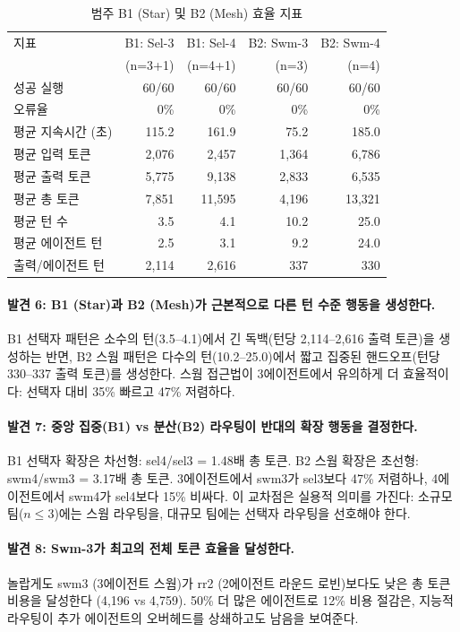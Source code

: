 \begin{table}[H]
\centering
\caption{범주 B1 (Star) 및 B2 (Mesh) 효율 지표}
\label{tab:cat-b}
{\small
\begin{tabular}{lrrrr}
\toprule
지표 & B1: Sel-3 & B1: Sel-4 & B2: Swm-3 & B2: Swm-4 \\
    & (n=3+1)   & (n=4+1)   & (n=3)     & (n=4)     \\
\midrule
성공 실행       & 60/60 & 60/60 & 60/60 & 60/60 \\
오류율           & 0\% & 0\% & 0\% & 0\% \\
평균 지속시간 (초) & 115.2 & 161.9 & 75.2 & 185.0 \\
평균 입력 토큰   & 2,076 & 2,457 & 1,364 & 6,786 \\
평균 출력 토큰   & 5,775 & 9,138 & 2,833 & 6,535 \\
평균 총 토큰     & 7,851 & 11,595 & 4,196 & 13,321 \\
평균 턴 수       & 3.5 & 4.1 & 10.2 & 25.0 \\
평균 에이전트 턴 & 2.5 & 3.1 & 9.2 & 24.0 \\
출력/에이전트 턴 & 2,114 & 2,616 & 337 & 330 \\
\bottomrule
\end{tabular}
}
\end{table}

\paragraph{발견 6: B1 (Star)과 B2 (Mesh)가 근본적으로 다른 턴 수준 행동을 생성한다.}
B1 선택자 패턴은 소수의 턴(3.5--4.1)에서 긴 독백(턴당 2,114--2,616 출력 토큰)을 생성하는 반면, B2 스웜 패턴은 다수의 턴(10.2--25.0)에서 짧고 집중된 핸드오프(턴당 330--337 출력 토큰)를 생성한다. 스웜 접근법이 3에이전트에서 유의하게 더 효율적이다: 선택자 대비 35\% 빠르고 47\% 저렴하다.

\paragraph{발견 7: 중앙 집중(B1) vs 분산(B2) 라우팅이 반대의 확장 행동을 결정한다.}
B1 선택자 확장은 차선형: sel4/sel3 = 1.48배 총 토큰. B2 스웜 확장은 초선형: swm4/swm3 = 3.17배 총 토큰. 3에이전트에서 swm3가 sel3보다 47\% 저렴하나, 4에이전트에서 swm4가 sel4보다 15\% 비싸다. 이 교차점은 실용적 의미를 가진다: 소규모 팀($n \leq 3$)에는 스웜 라우팅을, 대규모 팀에는 선택자 라우팅을 선호해야 한다.

\paragraph{발견 8: Swm-3가 최고의 전체 토큰 효율을 달성한다.}
놀랍게도 swm3 (3에이전트 스웜)가 rr2 (2에이전트 라운드 로빈)보다도 낮은 총 토큰 비용을 달성한다 (4,196 vs 4,759). 50\% 더 많은 에이전트로 12\% 비용 절감은, 지능적 라우팅이 추가 에이전트의 오버헤드를 상쇄하고도 남음을 보여준다.

